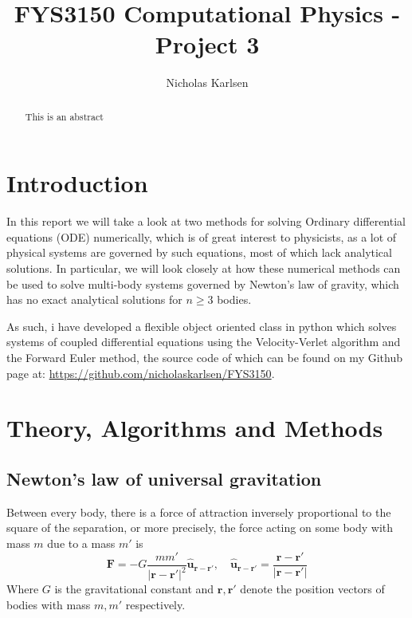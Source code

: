 \documentclass[10pt,showpacs,preprintnumbers,amsmath,amssymb,nofootinbib,aps,prl,twocolumn,groupedaddress,superscriptaddress,showkeys]{revtex4-1}
\begin{document}
\title{FYS3150 Computational Physics - Project 3}
\author{Nicholas Karlsen}


\begin{abstract}
This is an abstract
\end{abstract}

\maketitle


\section{Introduction}

  In this report we will take a look at two methods for solving Ordinary differential equations (ODE) numerically, which is of great interest to physicists, as a lot of physical systems are governed by such equations, most of which lack analytical solutions. In particular, we will look closely at how these numerical methods can be used to solve multi-body systems governed by Newton's law of gravity, which has no exact analytical solutions for $n\geq3$ bodies.

  As such, i have developed a flexible object oriented class in python which solves systems of coupled differential equations using the Velocity-Verlet algorithm and the Forward Euler method, the source code of which can be found on my Github page at: \url{https://github.com/nicholaskarlsen/FYS3150}. 

\section{Theory, Algorithms and Methods}
  
  \subsection{Newton's law of universal gravitation}
    Between every body, there is a force of attraction inversely proportional to the square of the separation, or more precisely, the force acting on some body with mass $m$ due to a mass $m'$ is
    \begin{equation}
      \mathbf F = -G\frac{m m'}{|\mathbf r - \mathbf r'|^2}\mathbf{\hat{u}_{r-r'}}, \quad \mathbf{\hat{u}_{r-r'}} = \frac{\mathbf r - \mathbf r'}{\mathbf |\mathbf r - \mathbf r'|}
    \end{equation}
    Where $G$ is the gravitational constant and $\mathbf r, \mathbf r'$ denote the position vectors of bodies with mass $m, m'$ respectively.
\end{document}
